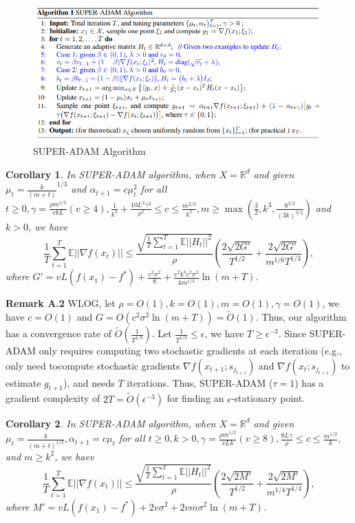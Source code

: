 \documentclass{article}
\newtheorem{corollary}{Corollary}[section]
\begin{document}
\begin{figure}[h]
	\label{fig2}
	\centering
	\includegraphics[scale = 0.5]{super-adam-algo.png}
	\caption{SUPER-ADAM Algorithm}
\end{figure}
\begin{corollary}
	\label{coro61appendix}
	In SUPER-ADAM algorithm, when $X=\mathbb{R}^d$ and given $\mu_t = \frac{k}{(m+t)}^{1/3}$ and $\alpha_{t+1} = c\mu^2_t$ for all $t\geq 0, \gamma = \frac{\rho m^{1/3}}{vkL}(v\geq 4), \frac{1}{k^3} + \frac{10L^2 \gamma^2}{\rho^2}\leq c \leq \frac{m^{2/3}}{k^2},
	m\geq\max(\frac{3}{2}, k^3, \frac{8^{3/2}}{(3k)^{3/2}})$ and $k > 0$, we have
	\begin{equation}
		\frac{1}{T}\sum^T_{t=1}\mathbb{E}||\nabla f(x_t)||\leq
		\frac{\sqrt{\frac{1}{T}\sum^T_{t=1}\mathbb{E}||H_t||^2}}{\rho}
		\left(\frac{2\sqrt{2G'}}{T^{1/2}} + \frac{2\sqrt{2G'}}{m^{1/6}T^{1/3}}\right),
	\end{equation}
	where $G'=vL(f(x_1) - f^*) + \frac{v^2 \sigma^2}{8} + \frac{v^2 k^4 c^2 \sigma^2}{4m^{1/3}}\ln(m+T)$.
\end{corollary}
\textbf{Remark A.2} \label{rmka2} WLOG, let $\rho = O(1), k = O(1), m = O(1), \gamma = O(1)$, we have $c=O(1)$ and $G = O(c^2 \sigma^2 \ln(m+T)) = \tilde{O}(1)$. Thus, our algorithm has a convergence rate of $\tilde{O}\left(\frac{1}{T^{1/3}}\right)$.
Let $\frac{1}{T^{1/3}}\leq \epsilon$, we have $T\geq \epsilon^{-3}$. Since SUPER-ADAM only requires computing two stochastic gradients at each iteration (e.g., only need tocompute stochastic gradients $\nabla f(x_{t+1}; s_{j_{t+1}})$
and $\nabla f(x_t; s_{j_{t+1}})$ to estimate $g_{t+1}$), and needs $T$ iterations. Thus, SUPER-ADAM ($\tau = 1$) has a gradient complexity of $2T = \tilde{O}(\epsilon^{-3})$ for finding an $\epsilon$-stationary point.
\begin{corollary}
	\label{coro62appendix}
	In SUPER-ADAM algorithm, when $X=\mathbb{R}^d$ and given $\mu_t = \frac{k}{(m+t)^{1/2}}, \alpha_{t+1} = c\mu_t$ for all $t\geq 0, k > 0, \gamma = \frac{\rho m^{1/2}}{vLk}(v\geq 8), \frac{8L\gamma}{\rho}\leq c \leq \frac{m^{1/2}}{k}$, and $m\geq k^2$, we haev
	\begin{equation}
		\frac{1}{T}\sum^T_{t=1}\mathbb{E}||\nabla f(x_t)||\leq
		\frac{\sqrt{\frac{1}{T}\sum^T_{t=1}\mathbb{E}||H_t||^2}}{\rho}
		\left(\frac{2\sqrt{2M'}}{T^{1/2}} + \frac{2\sqrt{2M'}}{m^{1/4}T^{1/4}}\right),
	\end{equation}
	where $M'=vL(f(x_1) - f^*) + 2v\sigma^2 + 2vm\sigma^2 \ln(m+T)$.
\end{corollary}
\end{document}

